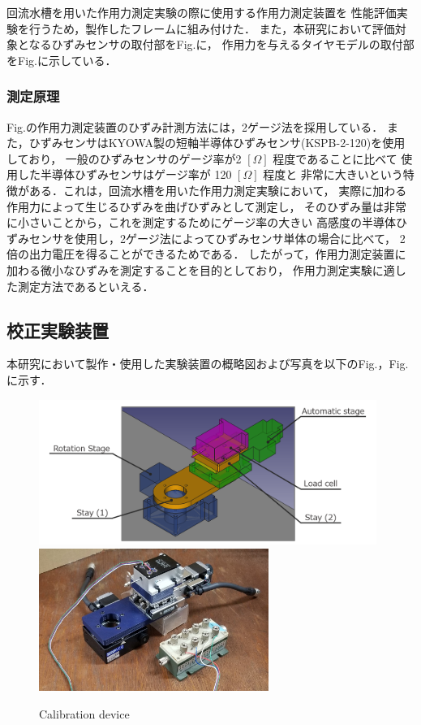 回流水槽を用いた作用力測定実験の際に使用する作用力測定装置を
性能評価実験を行うため，製作したフレームに組み付けた．
また，本研究において評価対象となるひずみセンサの取付部をFig.に，
作用力を与えるタイヤモデルの取付部をFig.に示している．

\newpage

\subsubsection{測定原理}

Fig.の作用力測定装置のひずみ計測方法には，2ゲージ法を採用している．
また，ひずみセンサはKYOWA製の短軸半導体ひずみセンサ(KSPB-2-120)を使用しており，
一般のひずみセンサのゲージ率が2 $[\Omega]$ 程度であることに比べて
使用した半導体ひずみセンサはゲージ率が 120 $[\Omega]$ 程度と
非常に大きいという特徴がある．これは，回流水槽を用いた作用力測定実験において，
実際に加わる作用力によって生じるひずみを曲げひずみとして測定し，
そのひずみ量は非常に小さいことから，これを測定するためにゲージ率の大きい
高感度の半導体ひずみセンサを使用し，2ゲージ法によってひずみセンサ単体の場合に比べて，
2倍の出力電圧を得ることができるためである．
したがって，作用力測定装置に加わる微小なひずみを測定することを目的としており，
作用力測定実験に適した測定方法であるといえる．

\subsection{校正実験装置}
本研究において製作・使用した実験装置の概略図および写真を以下のFig.，Fig.に示す．

\begin{figure}[htbp]
    \begin{center}
        \includegraphics[width=110mm]{images/22-1.png}
        \includegraphics[width=75mm]{images/22-2.png}
    \end{center}
    \caption{Calibration device}
\end{figure}

